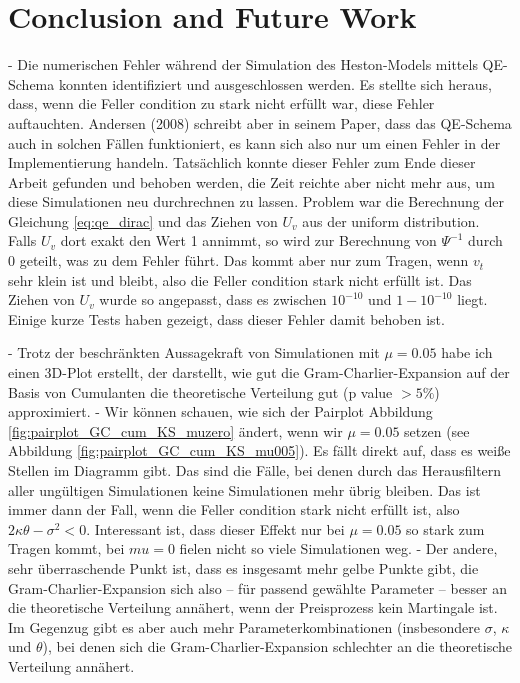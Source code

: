 \chapter{Conclusion and Future Work}
\label{sec:conclusion_future_work}

- Die numerischen Fehler während der Simulation des Heston-Models mittels QE-Schema konnten identifiziert und ausgeschlossen werden. Es stellte sich heraus, dass, wenn die Feller condition zu stark nicht erfüllt war, diese Fehler auftauchten. Andersen (2008) schreibt aber in seinem Paper, dass das QE-Schema auch in solchen Fällen funktioniert, es kann sich also nur um einen Fehler in der Implementierung handeln. Tatsächlich konnte dieser Fehler zum Ende dieser Arbeit gefunden und behoben werden, die Zeit reichte aber nicht mehr aus, um diese Simulationen neu durchrechnen zu lassen. Problem war die Berechnung der Gleichung \eqref{eq:qe_dirac} und das Ziehen von $U_v$ aus der uniform distribution. Falls $U_v$ dort exakt den Wert 1 annimmt, so wird zur Berechnung von $\Psi^{-1}$ durch 0 geteilt, was zu dem Fehler führt. Das kommt aber nur zum Tragen, wenn $v_t$ sehr klein ist und bleibt, also die Feller condition stark nicht erfüllt ist. Das Ziehen von $U_v$ wurde so angepasst, dass es zwischen $10^{-10}$ und $1-10^{-10}$ liegt. Einige kurze Tests haben gezeigt, dass dieser Fehler damit behoben ist.

- Trotz der beschränkten Aussagekraft von Simulationen mit $\mu=0.05$ habe ich einen 3D-Plot erstellt, der darstellt, wie gut die Gram-Charlier-Expansion auf der Basis von Cumulanten die theoretische Verteilung gut (p value $>5\%$) approximiert.
- Wir können schauen, wie sich der Pairplot Abbildung \ref{fig:pairplot_GC_cum_KS_muzero} ändert, wenn wir $\mu=0.05$ setzen (see Abbildung \ref{fig:pairplot_GC_cum_KS_mu005}). Es fällt direkt auf, dass es weiße Stellen im Diagramm gibt. Das sind die Fälle, bei denen durch das Herausfiltern aller ungültigen Simulationen keine Simulationen mehr übrig bleiben. Das ist immer dann der Fall, wenn die Feller condition stark nicht erfüllt ist, also $2\kappa\theta - \sigma^2 <0$. Interessant ist, dass dieser Effekt nur bei $\mu=0.05$ so stark zum Tragen kommt, bei $mu=0$ fielen nicht so viele Simulationen weg.
- Der andere, sehr überraschende Punkt ist, dass es insgesamt mehr gelbe Punkte gibt, die Gram-Charlier-Expansion sich also -- für passend gewählte Parameter -- besser an die theoretische Verteilung annähert, wenn der Preisprozess kein Martingale ist. Im Gegenzug gibt es aber auch mehr Parameterkombinationen (insbesondere $\sigma$, $\kappa$ und $\theta$), bei denen sich die Gram-Charlier-Expansion schlechter an die theoretische Verteilung annähert.

